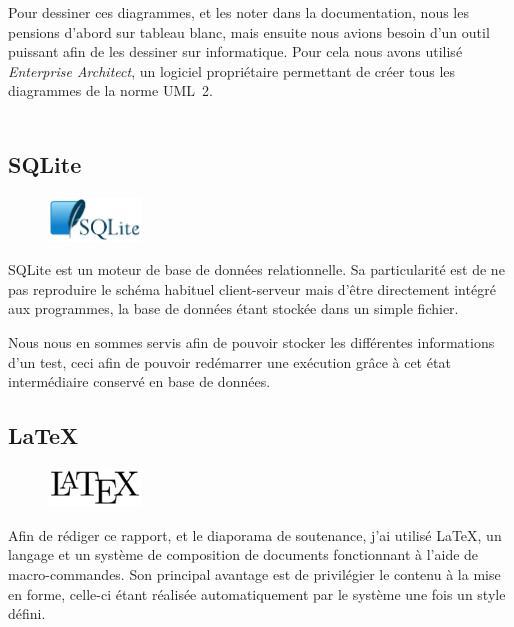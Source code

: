 Pour dessiner ces diagrammes, et les noter dans la documentation, nous les pensions d'abord sur tableau blanc, mais ensuite nous avions besoin d'un outil puissant afin de les dessiner sur informatique. Pour cela nous avons utilisé \textit{Enterprise Architect}, un logiciel propriétaire permettant de créer tous les diagrammes de la norme UML~2.\\~

\subsection{SQLite}
\begin{figure}
	\vspace{-20px}
	\includegraphics[width=2.5cm]{contents/images/sqlite.png}
\end{figure}
SQLite est un moteur de base de données relationnelle. Sa particularité est de ne pas reproduire le schéma habituel client-serveur mais d'être directement intégré aux programmes, la base de données étant stockée dans un simple fichier.

Nous nous en sommes servis afin de pouvoir stocker les différentes informations d'un test, ceci afin de pouvoir redémarrer une exécution grâce à cet état intermédiaire conservé en base de données.

\subsection{\LaTeX}
\begin{figure}
	\includegraphics[width=2.5cm]{contents/images/logoLatex.png}
\end{figure}
Afin de rédiger ce rapport, et le diaporama de soutenance, j'ai utilisé \LaTeX{}, un langage et un système de composition de documents fonctionnant à l'aide de
macro-commandes. Son principal avantage est de privilégier le contenu à la mise en forme, celle-ci étant réalisée automatiquement par le système une fois un style défini. 
